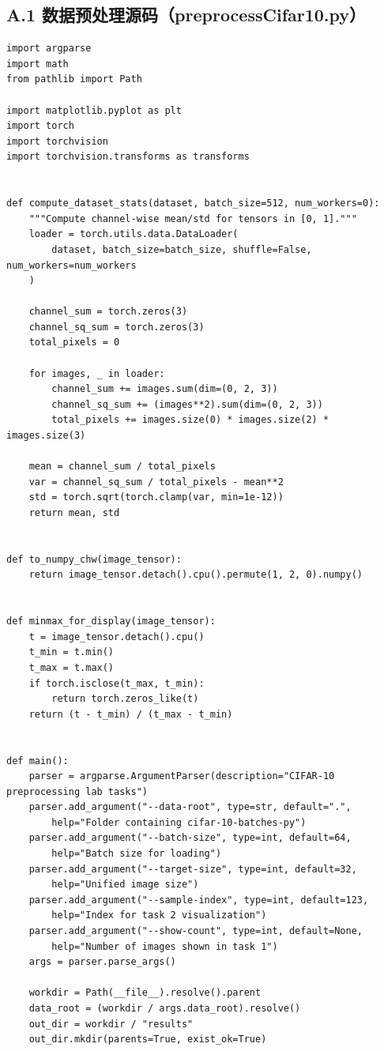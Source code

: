 \documentclass[12pt,a4paper]{ctexart}
\begin{document}
\subsection*{A.1 数据预处理源码（preprocessCifar10.py）}
\begin{lstlisting}
import argparse
import math
from pathlib import Path

import matplotlib.pyplot as plt
import torch
import torchvision
import torchvision.transforms as transforms


def compute_dataset_stats(dataset, batch_size=512, num_workers=0):
    """Compute channel-wise mean/std for tensors in [0, 1]."""
    loader = torch.utils.data.DataLoader(
        dataset, batch_size=batch_size, shuffle=False, num_workers=num_workers
    )

    channel_sum = torch.zeros(3)
    channel_sq_sum = torch.zeros(3)
    total_pixels = 0

    for images, _ in loader:
        channel_sum += images.sum(dim=(0, 2, 3))
        channel_sq_sum += (images**2).sum(dim=(0, 2, 3))
        total_pixels += images.size(0) * images.size(2) * images.size(3)

    mean = channel_sum / total_pixels
    var = channel_sq_sum / total_pixels - mean**2
    std = torch.sqrt(torch.clamp(var, min=1e-12))
    return mean, std


def to_numpy_chw(image_tensor):
    return image_tensor.detach().cpu().permute(1, 2, 0).numpy()


def minmax_for_display(image_tensor):
    t = image_tensor.detach().cpu()
    t_min = t.min()
    t_max = t.max()
    if torch.isclose(t_max, t_min):
        return torch.zeros_like(t)
    return (t - t_min) / (t_max - t_min)


def main():
    parser = argparse.ArgumentParser(description="CIFAR-10 preprocessing lab tasks")
    parser.add_argument("--data-root", type=str, default=".",
        help="Folder containing cifar-10-batches-py")
    parser.add_argument("--batch-size", type=int, default=64,
        help="Batch size for loading")
    parser.add_argument("--target-size", type=int, default=32,
        help="Unified image size")
    parser.add_argument("--sample-index", type=int, default=123,
        help="Index for task 2 visualization")
    parser.add_argument("--show-count", type=int, default=None,
        help="Number of images shown in task 1")
    args = parser.parse_args()

    workdir = Path(__file__).resolve().parent
    data_root = (workdir / args.data_root).resolve()
    out_dir = workdir / "results"
    out_dir.mkdir(parents=True, exist_ok=True)


\end{lstlisting}
\end{document}
